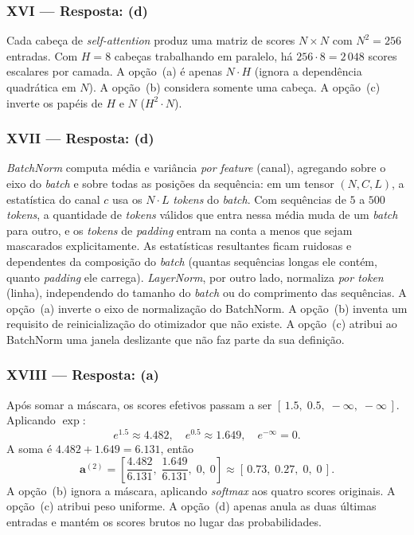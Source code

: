\documentclass{dlproblemset}
\begin{document}
\subsubsection*{XVI — Resposta: (d)}
Cada cabeça de \textit{self-attention} produz uma matriz de scores
$N \times N$ com $N^2 = 256$ entradas. Com $H = 8$ cabeças trabalhando em
paralelo, há $256 \cdot 8 = 2\,048$ scores escalares por camada.
A opção~(a) é apenas $N \cdot H$ (ignora a dependência quadrática em $N$).
A opção~(b) considera somente uma cabeça. A opção~(c) inverte os papéis
de $H$ e $N$ ($H^2 \cdot N$).

\subsubsection*{XVII — Resposta: (d)}
\textit{BatchNorm} computa média e variância \emph{por feature} (canal), agregando
sobre o eixo do \textit{batch} e sobre todas as posições da sequência: em um tensor
$(N, C, L)$, a estatística do canal $c$ usa os $N \cdot L$ \textit{tokens} do
\textit{batch}. Com sequências de $5$ a $500$ \textit{tokens}, a quantidade de
\textit{tokens} válidos que entra nessa média muda de um \textit{batch} para outro, e
os \textit{tokens} de \textit{padding} entram na conta a menos que sejam mascarados
explicitamente. As estatísticas resultantes ficam ruidosas e dependentes da composição
do \textit{batch} (quantas sequências longas ele contém, quanto \textit{padding} ele
carrega). \textit{LayerNorm}, por outro lado, normaliza \emph{por token} (linha),
independendo do tamanho do \textit{batch} ou do comprimento das sequências.
A opção~(a) inverte o eixo de normalização do BatchNorm. A opção~(b)
inventa um requisito de reinicialização do otimizador que não existe.
A opção~(c) atribui ao BatchNorm uma janela deslizante que não faz parte
da sua definição.

\subsubsection*{XVIII — Resposta: (a)}
Após somar a máscara, os scores efetivos passam a ser
$[\,1.5,\; 0.5,\; -\infty,\; -\infty\,]$. Aplicando $\exp$:
\[
  e^{1.5} \approx 4.482, \quad
  e^{0.5} \approx 1.649, \quad
  e^{-\infty} = 0.
\]
A soma é $4.482 + 1.649 = 6.131$, então
\[
  \mathbf{a}^{(2)} = \left[\frac{4.482}{6.131},\; \frac{1.649}{6.131},\; 0,\; 0\right]
         \approx [\,0.73,\; 0.27,\; 0,\; 0\,].
\]
A opção~(b) ignora a máscara, aplicando \textit{softmax} aos quatro
scores originais. A opção~(c) atribui peso uniforme. A opção~(d)
apenas anula as duas últimas entradas e mantém os scores brutos no lugar
das probabilidades.
\end{document}
